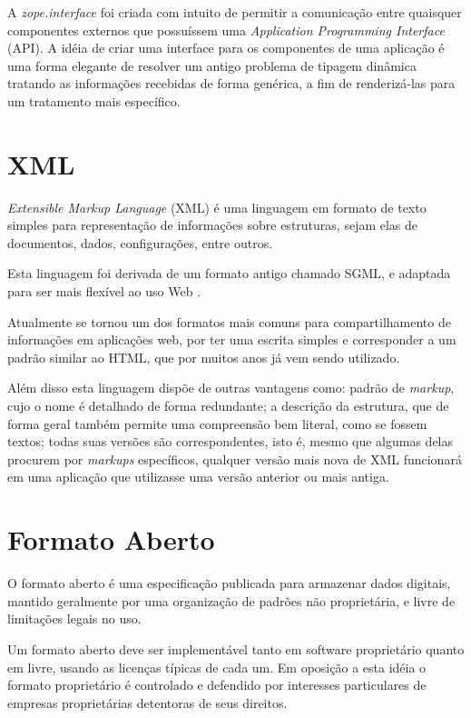 A \textit{zope.interface} foi criada com intuito de permitir a comunicação entre quaisquer componentes externos que possuíssem uma \textit{Application Programming Interface} (API). A idéia de criar uma interface para os componentes de uma aplicação é uma forma  elegante de resolver um antigo problema de tipagem dinâmica tratando as informações recebidas de forma genérica, a fim de renderizá-las para um tratamento mais específico.


\section{XML}

\textit{Extensible Markup Language} (XML) é uma linguagem em formato de texto simples para representação de informações sobre estruturas, sejam elas de documentos, dados, configurações, entre outros. 

Esta linguagem foi derivada de um formato antigo chamado SGML, e adaptada para ser mais flexível ao uso Web \cite{W3C-XML}.

Atualmente se tornou um dos formatos mais comuns para compartilhamento de informações em aplicações web, por ter uma escrita simples e corresponder a um padrão similar ao HTML, que por muitos anos já vem sendo utilizado.

Além disso esta linguagem dispõe de outras vantagens como: padrão de \textit{markup}, cujo o nome é detalhado de forma redundante; a descrição da estrutura, que de forma geral também permite uma compreensão bem literal, como se fossem textos; todas suas versões são correspondentes, isto é, mesmo que algumas delas procurem por \textit{markups} específicos, qualquer versão mais nova de XML funcionará em uma aplicação que utilizasse uma versão anterior ou mais antiga.


\section{Formato Aberto}

O formato aberto é uma especificação publicada para armazenar dados digitais, mantido geralmente por uma organização de padrões não proprietária, e livre de limitações legais no uso.

Um formato aberto deve ser implementável tanto em software proprietário quanto em livre, usando as licenças típicas de cada um. Em oposição a esta idéia o formato proprietário é controlado e defendido por interesses particulares de empresas proprietárias detentoras de seus direitos.

